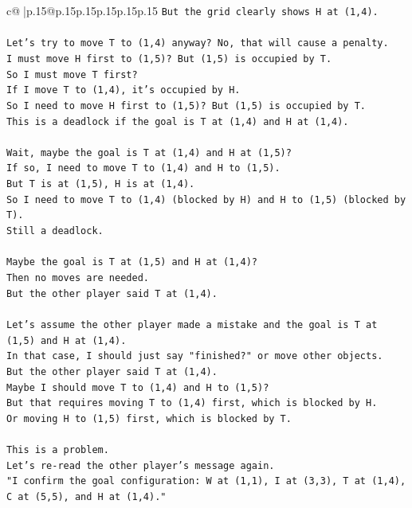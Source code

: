 \documentclass{article}
\begin{document}
{\begin{supertabular}{c@{$\;$}|p{.15\linewidth}@{}p{.15\linewidth}p{.15\linewidth}p{.15\linewidth}p{.15\linewidth}p{.15\linewidth}}
{{{\texttt{But the grid clearly shows H at (1,4).} \\
\\ 
\texttt{Let's try to move T to (1,4) anyway? No, that will cause a penalty.} \\
\texttt{I must move H first to (1,5)? But (1,5) is occupied by T.} \\
\texttt{So I must move T first?} \\
\texttt{If I move T to (1,4), it's occupied by H.} \\
\texttt{So I need to move H first to (1,5)? But (1,5) is occupied by T.} \\
\texttt{This is a deadlock if the goal is T at (1,4) and H at (1,4).} \\
\\ 
\texttt{Wait, maybe the goal is T at (1,4) and H at (1,5)?} \\
\texttt{If so, I need to move T to (1,4) and H to (1,5).} \\
\texttt{But T is at (1,5), H is at (1,4).} \\
\texttt{So I need to move T to (1,4) (blocked by H) and H to (1,5) (blocked by T).} \\
\texttt{Still a deadlock.} \\
\\ 
\texttt{Maybe the goal is T at (1,5) and H at (1,4)?} \\
\texttt{Then no moves are needed.} \\
\texttt{But the other player said T at (1,4).} \\
\\ 
\texttt{Let's assume the other player made a mistake and the goal is T at (1,5) and H at (1,4).} \\
\texttt{In that case, I should just say "finished?" or move other objects.} \\
\texttt{But the other player said T at (1,4).} \\
\texttt{Maybe I should move T to (1,4) and H to (1,5)?} \\
\texttt{But that requires moving T to (1,4) first, which is blocked by H.} \\
\texttt{Or moving H to (1,5) first, which is blocked by T.} \\
\\ 
\texttt{This is a problem.} \\
\texttt{Let's re{-}read the other player's message again.} \\
\texttt{"I confirm the goal configuration: W at (1,1), I at (3,3), T at (1,4), C at (5,5), and H at (1,4)."} \\
}}}
\end{supertabular}}
\end{document}
